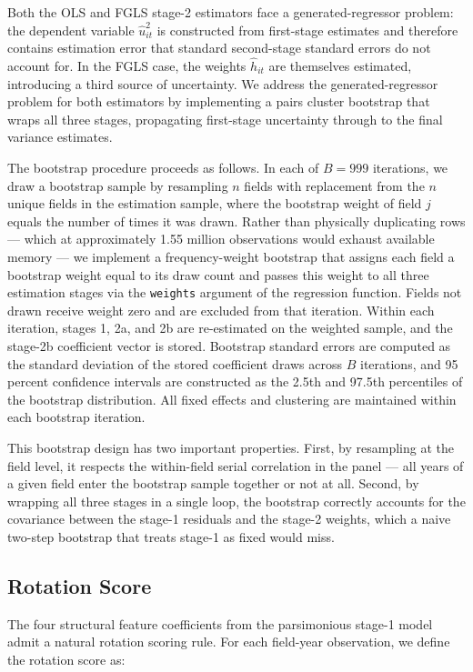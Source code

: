 \documentclass[12pt,letterpaper]{article}
\theoremstyle{remark}
\theoremstyle{plain}
\theoremstyle{definition}
\begin{document}
Both the OLS and FGLS stage-2 estimators face a generated-regressor problem: the dependent variable $\hat{u}_{it}^2$ is constructed from first-stage estimates and therefore contains estimation error that standard second-stage standard errors do not account for. In the FGLS case, the weights $\hat{h}_{it}$ are themselves estimated, introducing a third source of uncertainty. We address the generated-regressor problem for both estimators by implementing a pairs cluster bootstrap that wraps all three stages, propagating first-stage uncertainty through to the final variance estimates.

The bootstrap procedure proceeds as follows. In each of $B = 999$ iterations, we draw a bootstrap sample by resampling $n$ fields with replacement from the $n$ unique fields in the estimation sample, where the bootstrap weight of field $j$ equals the number of times it was drawn. Rather than physically duplicating rows — which at approximately 1.55 million observations would exhaust available memory — we implement a frequency-weight bootstrap that assigns each field a bootstrap weight equal to its draw count and passes this weight to all three estimation stages via the \texttt{weights} argument of the regression function. Fields not drawn receive weight zero and are excluded from that iteration. Within each iteration, stages 1, 2a, and 2b are re-estimated on the weighted sample, and the stage-2b coefficient vector is stored. Bootstrap standard errors are computed as the standard deviation of the stored coefficient draws across $B$ iterations, and 95 percent confidence intervals are constructed as the 2.5th and 97.5th percentiles of the bootstrap distribution. All fixed effects and clustering are maintained within each bootstrap iteration.

This bootstrap design has two important properties. First, by resampling at the field level, it respects the within-field serial correlation in the panel — all years of a given field enter the bootstrap sample together or not at all. Second, by wrapping all
three stages in a single loop, the bootstrap correctly accounts for the covariance between the stage-1 residuals and the stage-2 weights, which a naive two-step bootstrap that treats stage-1 as fixed would miss.

\subsection{\label{subsec:rot_score}Rotation Score}
The four structural feature coefficients from the parsimonious stage-1 model admit a natural rotation scoring rule. For each field-year observation, we define the rotation score as:
\end{document}

